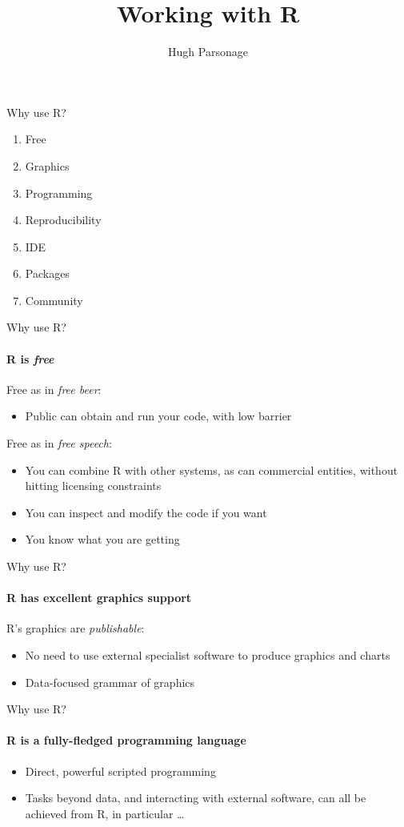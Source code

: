 \documentclass{grattan_pres}\usepackage[]{graphicx}\usepackage[]{color}
\title{Working with R}
\author{Hugh Parsonage}
\begin{document}
\begin{frame}{Why use R?}
\begin{enumerate}
\item Free
\item Graphics
\item Programming
\item Reproducibility
\item IDE
\item Packages
\item Community
\end{enumerate}

\end{frame}

\begin{frame}{Why use R?}
\framesubtitle{R is \emph{free}}

Free as in \emph{free beer}:
\begin{itemize}
\item Public can obtain and run your code, with low barrier
\end{itemize}

Free as in \emph{free speech}:
\begin{itemize}
\item You can combine R with other systems, as can commercial entities, without hitting licensing constraints
\item You can inspect and modify the code if you want
\item You know what you are getting
\end{itemize}
\end{frame}

\begin{frame}{Why use R?}
\framesubtitle{R has excellent graphics support}

R's graphics are \emph{publishable}:
\begin{itemize}
\item No need to use external specialist software to produce graphics and charts
\item Data-focused grammar of graphics
\end{itemize}
\end{frame}

\begin{frame}{Why use R?}
\framesubtitle{R is a fully-fledged programming language}

\begin{itemize}
\item Direct, powerful scripted programming 
\item Tasks beyond data, and interacting with external software, can all be achieved from R, in particular \dots{}
\end{itemize}
\end{frame}
\end{document}
